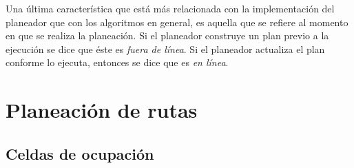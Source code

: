 \documentclass[a4paper]{article}
\begin{document}
Una última característica que está más relacionada con la implementación del planeador que con los algoritmos en general, es aquella que se refiere al momento en que se realiza la planeación. Si el planeador construye un plan previo a la ejecución se dice que éste es \textit{fuera de línea}. Si el planeador actualiza el plan conforme lo ejecuta, entonces se dice que es \textit{en línea}.

\section{Planeación de rutas}
\label{sec:PathPlanning}
\subsection{Celdas de ocupación}
\end{document}
